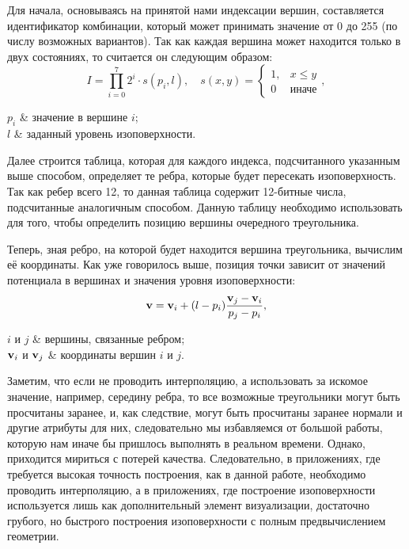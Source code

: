 Для начала, основываясь на принятой нами индексации вершин, составляется идентификатор комбинации, который может принимать значение от 0 до 255 (по числу возможных вариантов). Так как каждая вершина может находится только в двух состояниях, то считается он следующим образом:
\begin{equation} \label{eq:case}
  I = \prod_{i=0}^{7} 2^i \cdot s(p_i, l), \quad s(x, y) =
  \begin{cases}
    1, & x \leq y \\
    0 & \text{иначе}
  \end{cases},
\end{equation}
\begin{conditions}
  $p_i$ & значение в вершине $i$;\\
  $l$ & заданный уровень изоповерхности.
\end{conditions}

Далее строится таблица, которая для каждого индекса, подсчитанного указанным выше способом, определяет те ребра, которые будет пересекать изоповерхность. Так как ребер всего 12, то данная таблица содержит 12-битные числа, подсчитанные аналогичным способом. Данную таблицу необходимо использовать для того, чтобы определить позицию вершины очередного треугольника.

Теперь, зная ребро, на которой будет находится вершина треугольника, вычислим её координаты. Как уже говорилось выше, позиция точки зависит от значений потенциала в вершинах и значения уровня изоповерхности:
\begin{equation} \label{eq:vertex}
  \boldsymbol{\mathbf{v}} = \boldsymbol{\mathbf{v}}_i + (l - p_i)\frac{\boldsymbol{\mathbf{v}}_j - \boldsymbol{\mathbf{v}}_i}{p_j - p_i},
\end{equation}
\begin{conditions}
  $i$ и $j$ & вершины, связанные ребром;\\
  $\boldsymbol{\mathbf{v}}_i$ и $\boldsymbol{\mathbf{v}}_j$ & координаты вершин $i$ и $j$.
\end{conditions}

Заметим, что если не проводить интерполяцию, а использовать за искомое значение, например, середину ребра, то все возможные треугольники могут быть просчитаны заранее, и, как следствие, могут быть просчитаны заранее нормали и другие атрибуты для них, следовательно мы избавляемся от большой работы, которую нам иначе бы пришлось выполнять в реальном времени. Однако, приходится мириться с потерей качества. Следовательно, в приложениях, где требуется высокая точность построения, как в данной работе, необходимо проводить интерполяцию, а в приложениях, где построение изоповерхности используется лишь как дополнительный элемент визуализации, достаточно грубого, но быстрого построения изоповерхности с полным предвычислением геометрии.


